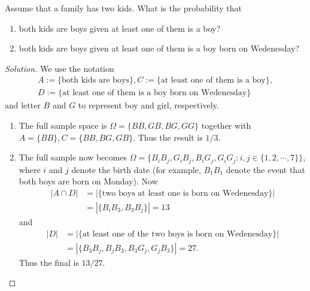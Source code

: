 \documentclass[11pt,singlecolumn, openany, citestyle=authoryear]{elegantbook}
\begin{document}
\begin{CJK}{UTF8}{gbsn}
\begin{example} 
    Assume that a family has two kids.  What is the probability that 
    \begin{enumerate}
        \item both kids are boys given at least one of them is a boy?
        \item both kids are boys given at least one of them is a boy born on Wedenesday?
    \end{enumerate} 
\end{example}
\begin{proof}[Solution]
    We use the notation 
    \begin{gather*}
    A := \{\text{both kids are boys}\}, 
    C := \{\text{at least one of them is a boy}\},\\ 
    D := \{\text{at least one of them is a boy born on Wedenesday}\}
    \end{gather*}
    and letter $B$ and $G$ to represent boy and girl, respectively. 
    \begin{enumerate}
        \item The full sample space is $\Omega = \{BB,GB,BG,GG\}$ together with
        $A = \{BB\}, C = \{BB, BG,GB\}$. Thus the result is $1/3$.
        \item The full sample now becomes  $\Omega = \{B_iB_j,G_iB_j,B_iG_j,G_iG_j:
        i,j \in \{1,2,\cdots,7\}\}$, where $i$ and $j$ denote the birth date (for example,
        $B_1B_1$ denote the event that both boys are born on Monday). 
        Now 
        \begin{align*}
            |A\cap D| &= |\{\text{two boys at least one is born on Wedenesday}\}|\\
            &=|\{B_iB_3,B_3B_j\}| = 13
        \end{align*}
        and 
        \begin{align*}
            |D|&=|\{\text{at least one of the two boys is born on Wedenesday}\}|\\
            &=|\{B_3B_j,B_jB_3, B_3G_j,G_jB_3\}| = 27.
        \end{align*}
        Thus the final is $13/27$.
    \end{enumerate}
\end{proof}


\end{CJK}
\end{document}
